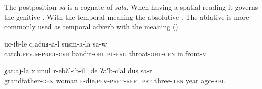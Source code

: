 The postposition \textit{sa} is a cognate of \textit{sala}. When having a spatial reading it governs the genitive . With the temporal meaning  the absolutive . The ablative  is more commonly used as temporal adverb with the meaning  ().
%
\begin{exe}
	\ex
	\begin{xlist}
		\ex	\label{the bandits caught (him) at the throat}
		\gll	uc-ib-le	qːačuʁ-a-l	susm-a-la	sa-w\\
			catch.\textsc{pfv.m}-\textsc{pret}-\textsc{cvb}	bandit-\textsc{obl}.\textsc{pl}-\textsc{erg}	throat-\textsc{obl}-\textsc{gen}	in.front-\textsc{m}\\
		\glt	{}

		\ex	\label{Grandfather’s wife died 30 years ago}
		\gll	χatːaj-la	xːunul	r-ebč'-ib-il=de	ʡaˁb-c'al	dus	sa-r\\
			grandfather-\textsc{gen}	woman	\textsc{f}-die.\textsc{pfv}-\textsc{pret}-\textsc{ref}=\textsc{pst}	three-\textsc{ten}	year	ago-\textsc{abl}\\
		\glt	{}
	\end{xlist}
\end{exe}



\subsection{ }
\label{ssec:postposition hila}

